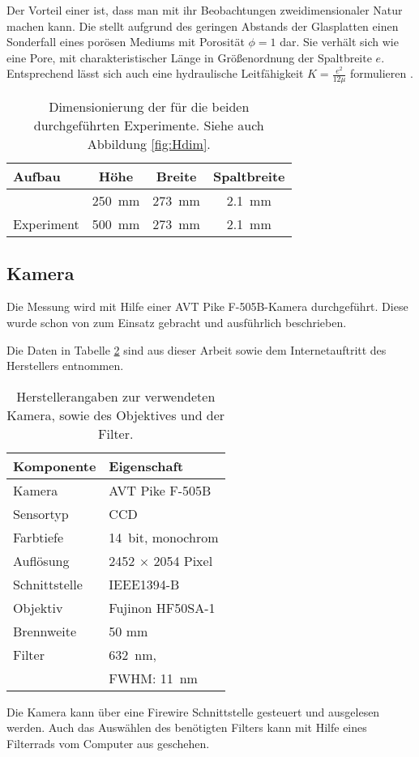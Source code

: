 Der Vorteil einer \HSC ist, dass man mit ihr Beobachtungen zweidimensionaler Natur machen kann.
Die \HSC stellt aufgrund des geringen Abstands der Glasplatten einen Sonderfall eines porösen Mediums mit Porosität $\phi = 1$ dar. Sie verhält sich wie eine Pore, mit charakteristischer Länge in Größenordnung der Spaltbreite $e$. Entsprechend lässt sich auch eine hydraulische Leitfähigkeit $K = \frac{e^2}{12\mu}$ formulieren \citep{fernandez}. 


\begin{table}[b]
  \begin{tabularx}{\linewidth}{X|c|c|c} %
    Aufbau			& Höhe				& Breite			& Spaltbreite \\
    \hline\hline
    \COTm 			& \SI{ 250}{\milli\meter}	& \SI{273}{\milli\meter}	& \SI[round-precision=1]{2,1}{\milli\meter} \\
    Experiment			& \SI{ 500}{\milli\meter}	& \SI{273}{\milli\meter}	& \SI[round-precision=1]{2,1}{\milli\meter}
  \end{tabularx}
  \caption{Dimensionierung der \HSCs für die beiden durchgeführten Experimente. Siehe auch Abbildung \ref{fig:Hdim}.}
  \label{tab:Hdim}
\end{table}

\subsection{Kamera}
\label{sec:cam}
Die Messung wird mit Hilfe einer AVT Pike F-505B-Kamera durchgeführt. Diese wurde schon von \cite{heberle} zum Einsatz gebracht und ausführlich
beschrieben. 

Die Daten in Tabelle \ref{tab:cam} sind aus dieser Arbeit sowie dem Internetauftritt des Herstellers \citep{pike_sheet} entnommen. 
\begin{table}[b]
 \begin{tabularx}{\linewidth}{X|X}
  Komponente	& Eigenschaft \\
  \hline\hline
  Kamera	& AVT Pike F-505B \\
  Sensortyp	& CCD \\
  Farbtiefe	& \SI{14}{bit}, monochrom \\
  Auflösung	& 2452 $\times$ 2054 Pixel \\
  Schnittstelle	& IEEE1394-B \\
  \hline
  Objektiv	& Fujinon HF50SA-1 \\
  Brennweite	& 50 mm \\
  \hline
  Filter	& \SI{632}{\nano\meter}, \\
		& FWHM: \SI{11}{\nano\meter} 
 \end{tabularx}
 \caption{Herstellerangaben zur verwendeten Kamera, sowie des Objektives und der Filter.}
 \label{tab:cam}
\end{table}
Die Kamera kann über eine Firewire Schnittstelle gesteuert und ausgelesen werden. Auch das Auswählen des benötigten Filters kann mit Hilfe eines Filterrads
vom Computer aus geschehen.


